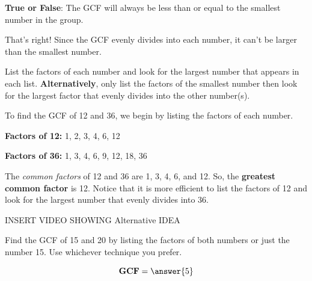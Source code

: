 \documentclass{ximera}[font=12pt]  %
\begin{document}
\begin{problem} \textcolor{glaucous!55!black}{\textbf{True or False}}:  The GCF will always be less than or equal to the smallest number in the group.

\begin{multipleChoice}
\end{multipleChoice}

\begin{feedback}[correct]
That's right!  Since the GCF evenly divides into each number, it can't be larger than the smallest number.
\end{feedback}

\end{problem}



\begin{procedure}

List the factors of each number and look for the largest number that appears in each list.  \textbf{Alternatively}, 
only list the factors of the smallest number then look for the largest factor that evenly divides into the other number(s).

\end{procedure}


\begin{example}

To find the GCF of 12 and 36, we begin by listing the factors of each number.


\qquad \textbf{Factors of 12:} 1, 2, 3, 4, 6, 12

\qquad \textbf{Factors of 36:} 1, 3, 4, 6, 9, 12, 18, 36


The \textit{common factors} of 12 and 36 are 1, 3, 4, 6, and 12.  So, the \textbf{greatest common factor} is 12.  
Notice that it is more efficient to list the factors of 12 and look for the largest number that evenly divides into 36.  

\end{example}


INSERT VIDEO SHOWING Alternative IDEA


\begin{problem}
Find the GCF of 15 and 20 by listing the factors of both numbers or just the number 15.  Use whichever technique you prefer.

\[ \textbf{GCF} = \answer{5} \]

\end{problem}
\end{document}
